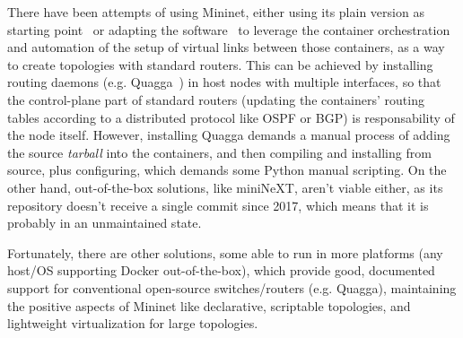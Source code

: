 There have been attempts of using Mininet, either using its plain version as starting point~\cite{mininetquagga,mininetospfbgp} or adapting the software~\cite{mininext} to leverage the container orchestration and automation of the setup of virtual links between those containers, as a way to create topologies with standard routers.
This can be achieved by installing routing daemons (e.g. Quagga~\cite{quagga}) in host nodes with multiple interfaces, so that the control-plane part of standard routers (updating the containers' routing tables according to a distributed protocol like OSPF or BGP) is responsability of the node itself.
However, installing Quagga demands a manual process of adding the source \emph{tarball} into the containers, and then compiling and installing from source, plus configuring, which demands some Python manual scripting.
On the other hand, out-of-the-box solutions, like miniNeXT, aren't viable either, as its repository doesn't receive a single commit since 2017, which means that it is probably in an unmaintained state.

Fortunately, there are other solutions, some able to run in more platforms (any host/OS supporting Docker out-of-the-box), which provide good, documented support for conventional open-source switches/routers (e.g. Quagga), maintaining the positive aspects of Mininet like declarative, scriptable topologies, and lightweight virtualization for large topologies.

